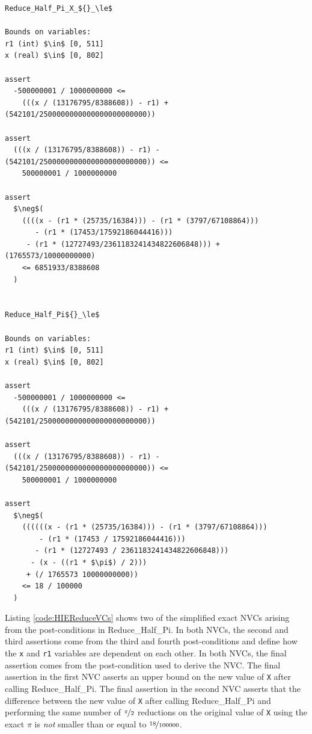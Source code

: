 \documentclass[runningheads]{llncs}
\begin{document}
\begin{lstlisting}[caption=Selected Reduce\_Half\_Pi Simplified Exact NVCs, label={code:HIEReduceVCs},basicstyle=\fontsize{7.5}{9pt}\tt,float=tp]
Reduce_Half_Pi_X_${}_\le$

Bounds on variables:
r1 (int) $\in$ [0, 511]
x (real) $\in$ [0, 802]

assert
  -500000001 / 1000000000 <=
    (((x / (13176795/8388608)) - r1) + (542101/2500000000000000000000000))

assert
  (((x / (13176795/8388608)) - r1) - (542101/2500000000000000000000000)) <=
    500000001 / 1000000000

assert
  $\neg$(
    ((((x - (r1 * (25735/16384))) - (r1 * (3797/67108864))) 
       - (r1 * (17453/17592186044416)))
     - (r1 * (12727493/2361183241434822606848))) + (1765573/10000000000) 
    <= 6851933/8388608
  )


Reduce_Half_Pi${}_\le$

Bounds on variables:
r1 (int) $\in$ [0, 511]
x (real) $\in$ [0, 802]

assert
  -500000001 / 1000000000 <=
    (((x / (13176795/8388608)) - r1) + (542101/2500000000000000000000000))

assert
  (((x / (13176795/8388608)) - r1) - (542101/2500000000000000000000000)) <=
    500000001 / 1000000000

assert
  $\neg$(
    ((((((x - (r1 * (25735/16384))) - (r1 * (3797/67108864))) 
        - (r1 * (17453 / 17592186044416)))
       - (r1 * (12727493 / 2361183241434822606848)))
      - (x - ((r1 * $\pi$) / 2)))
     + (/ 1765573 10000000000))
    <= 18 / 100000 
  )
\end{lstlisting}

Listing \ref{code:HIEReduceVCs} shows two of the simplified exact NVCs arising from the post-conditions in Reduce\_Half\_Pi.
In both NVCs, the second and third assertions come from the third and fourth post-conditions and define how the \lstinline{x} and \lstinline{r1} variables are dependent on each other.
In both NVCs, the final assertion comes from the post-condition used to derive the NVC.
The final assertion in the first NVC asserts an upper bound on the new value of \lstinline{X} after calling Reduce\_Half\_Pi.
The final assertion in the second NVC asserts that the difference between the new value of \lstinline{X} after calling Reduce\_Half\_Pi and performing the same number of $\nicefrac{\pi}{2}$ reductions on the original value of \lstinline{X} using the exact $\pi$ is \emph{not} smaller than or equal to $\nicefrac{18}{100000}$.
\end{document}
